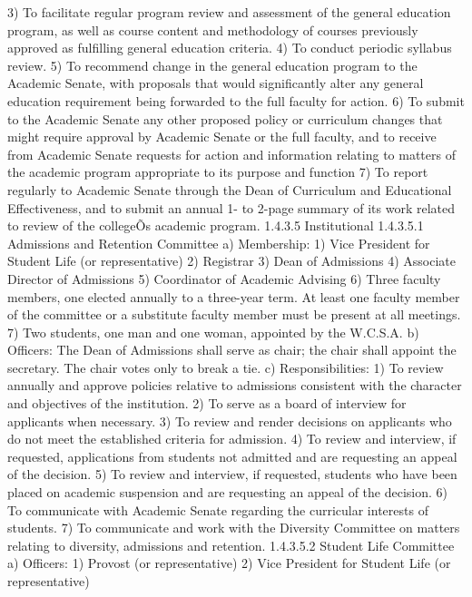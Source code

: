 \documentclass[letterpaper, 11pt]{article}
\begin{document}
			3) To facilitate regular program review and assessment of the general education program, as well as course content and methodology of courses previously approved as fulfilling general education criteria.
			4) To conduct periodic syllabus review.
			5) To recommend change in the general education program to the Academic Senate, with proposals that would significantly alter any general education requirement being forwarded to the full faculty for action.
			6) To submit to the Academic Senate any other proposed policy or curriculum changes that might require approval by Academic Senate or the full faculty, and to receive from Academic Senate requests for action and information relating to matters of the academic program appropriate to its purpose and function
			7) To report regularly to Academic Senate through the Dean of Curriculum and Educational Effectiveness, and to submit an annual 1- to 2-page summary of its work related to review of the collegeÕs academic program.
			1.4.3.5 Institutional
			1.4.3.5.1 Admissions and Retention Committee
			a) Membership:
			1) Vice President for Student Life (or representative)
			2) Registrar
			3) Dean of Admissions
			4) Associate Director of Admissions
			5) Coordinator of Academic Advising
			6) Three faculty members, one elected annually to a three-year term.  At least one faculty member of the committee or a substitute faculty member must be present at all meetings.
			7) Two students, one man and one woman, appointed by the W.C.S.A.
			b) Officers:
			The Dean of Admissions shall serve as chair; the chair shall appoint the secretary.  The chair votes only to break a tie.
			c) Responsibilities:
			1) To review annually and approve policies relative to admissions consistent with the character and objectives of the institution.
			2) To serve as a board of interview for applicants when necessary.
			3) To review and render decisions on applicants who do not meet the established criteria for admission.
			4) To review and interview, if requested, applications from students not admitted and are requesting an appeal of the decision.
			5) To review and interview, if requested, students who have been placed on academic suspension and are requesting an appeal of the decision.
			6) To communicate with Academic Senate regarding the curricular interests of students.
			7) To communicate and work with the Diversity Committee on matters relating to diversity, admissions and retention.
			1.4.3.5.2 Student Life Committee
			a) Officers:
			1) Provost (or representative)
			2) Vice President for Student Life (or representative)
\end{document}
